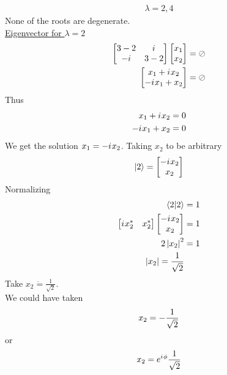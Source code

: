 \begin{enumerate}
\begin{eqnarray}
		 \lambda = 2,4
	 \end{eqnarray}
	None of the roots are degenerate.\\
	\underline{Eigenvector for $\lambda=2$}\\
	\begin{eqnarray}
		\left[\begin{matrix}
		3-2 & {i\mkern1mu} \\ -{i\mkern1mu} & 3-2
		\end{matrix}\right]
		\left[\begin{matrix}
		x_1 \\ x_2
		\end{matrix}\right]
		&= \oslash \nonumber \\
		\left[\begin{matrix}
		x_1 + {i\mkern1mu} x_2 \\ -{i\mkern1mu} x_1 + x_2
		\end{matrix}\right]
		&= \oslash \nonumber
	\end{eqnarray}
	Thus
	\begin{eqnarray}
		x_1 + {i\mkern1mu} x_2 &= 0 \label{chapter5.eqn2-example2} \\
		-{i\mkern1mu} x_1 + x_2 &= 0 \label{chapter5.eqn3-example2}
	\end{eqnarray}
	We get the solution $x_1 = -{i\mkern1mu} x_2$. Taking $x_2$ to be arbitrary
	\begin{equation}
		\ket{2} = \left[\begin{matrix}
			-{i\mkern1mu} x_2 \\ x_2
		\end{matrix}\right]
	\end{equation}
	Normalizing
	\begin{eqnarray}
		\braket{2}{2} &= 1 \nonumber \\
		\left[\begin{matrix}
		{i\mkern1mu} x_2^* & x_2^*
		\end{matrix}\right]
				\left[\begin{matrix}
		-{i\mkern1mu} x_2 \\ x_2
		\end{matrix}\right] 
		&=1 \nonumber \\
		2 \left|x_2\right|^2 &= 1 \nonumber \\
		\left|x_2\right| = \frac{1}{\sqrt{2}}
	\end{eqnarray}
	Take $x_2 \dot{=} \frac{1}{\sqrt{2}}$.\\
	We could have taken
	\begin{equation}
		x_2 = -\frac{1}{\sqrt{2}} \\
	\end{equation}
	or
	\begin{equation}
		x_2 = e^{{i\mkern1mu} \phi} \frac{1}{\sqrt{2}} \\
	\end{equation}


\end{enumerate}
